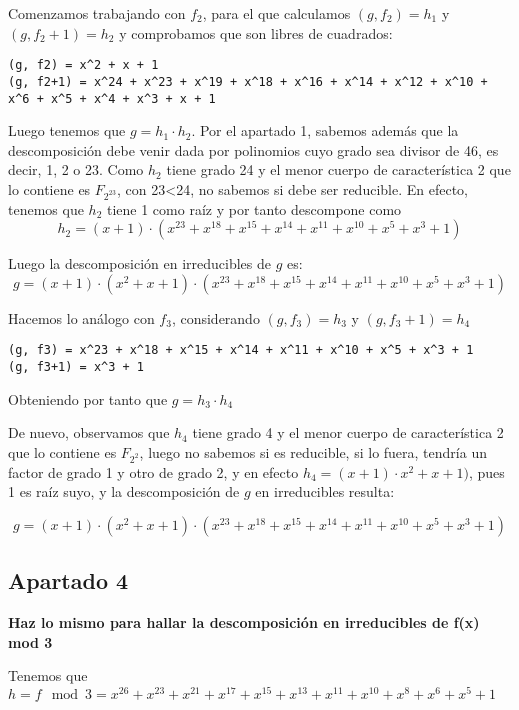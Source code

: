 \documentclass[a4paper]{article}
\begin{document}
Comenzamos trabajando con $f_2$, para el que calculamos $(g, f_2) =h_1$ y $(g, f_2+1)=h_2$ y comprobamos que son libres de cuadrados:

\begin{verbatim}
(g, f2) = x^2 + x + 1
(g, f2+1) = x^24 + x^23 + x^19 + x^18 + x^16 + x^14 + x^12 + x^10 + x^6 + x^5 + x^4 + x^3 + x + 1
\end{verbatim}

Luego tenemos que $g=h_1\cdot h_2$.
Por el apartado 1, sabemos además que la descomposición debe venir dada por polinomios cuyo grado sea divisor de 46, es decir, 1, 2 o 23. Como $h_2$ tiene grado 24 y el menor cuerpo de característica 2 que lo contiene es $F_{2^{23}}$, con 23<24, no sabemos si debe ser reducible. En efecto, tenemos que $h_2$ tiene 1 como raíz y por tanto descompone como 
$$h_2=(x+1)\cdot (x^{23}+x^{18}+x^{15}+x^{14}+x^{11}+x^{10}+x^5+x^3+1)$$

Luego la descomposición en irreducibles de $g$ es:
$$g=(x+1)\cdot (x^2+x+1) \cdot (x^{23}+x^{18}+x^{15}+x^{14}+x^{11}+x^{10}+x^5+x^3+1)$$

Hacemos lo análogo con $f_3$, considerando $(g, f_3) =h_3$ y $(g, f_3+1)=h_4$ 

\begin{verbatim}
(g, f3) = x^23 + x^18 + x^15 + x^14 + x^11 + x^10 + x^5 + x^3 + 1
(g, f3+1) = x^3 + 1
\end{verbatim}

Obteniendo por tanto que $g=h_3\cdot h_4$

De nuevo, observamos que $h_4$ tiene grado 4 y el menor cuerpo de característica 2 que lo contiene es $F_{2^{2}}$, luego no sabemos si es reducible, si lo fuera, tendría un factor de grado 1 y otro de grado 2, y en efecto $h_4=(x+1)\cdot x^2+x+1)$, pues 1 es raíz suyo, y la descomposición de $g$ en irreducibles resulta:

$$g=(x+1)\cdot (x^2+x+1) \cdot (x^{23}+x^{18}+x^{15}+x^{14}+x^{11}+x^{10}+x^5+x^3+1)$$







\subsection{Apartado 4}
\textbf{Haz lo mismo para hallar la descomposición en irreducibles de f(x) mod 3}

Tenemos que $h = f \mod 3 = x^{26} + x^{23} + x^{21} + x^{17} + x^{15} + x^{13} + x^{11} + x^{10} + x^8 + x^6 + x^5 + 1$
\end{document}
